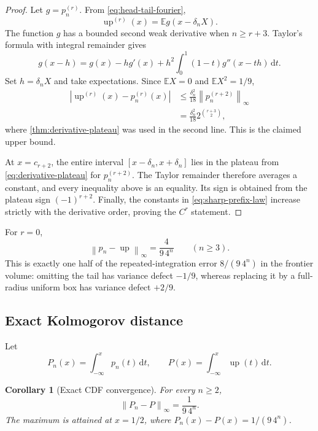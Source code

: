 \documentclass[11pt]{article}
\newtheorem{corollary}[theorem]{Corollary}
\theoremstyle{definition}
\theoremstyle{remark}
\newcommand{\E}{\mathbb E}
\newcommand{\Up}{\operatorname{up}}
\newcommand{\dd}{\,\mathrm d}
\newcommand{\norm}[1]{\left\lVert #1\right\rVert}
\newcommand{\abs}[1]{\left\lvert #1\right\rvert}
\begin{document}
\begin{proof}
Let $g=p_n^{(r)}$.  From \cref{eq:head-tail-fourier},
\[
 \Up^{(r)}(x)=\E g(x-\delta_nX).
\]
The function $g$ has a bounded second weak derivative when $n\ge r+3$.
Taylor's formula with integral remainder gives
\[
 g(x-h)=g(x)-hg'(x)+h^2\int_0^1(1-t)g''(x-th)\dd t.
\]
Set $h=\delta_nX$ and take expectations.  Since $\E X=0$ and $\E X^2=1/9$,
\begin{align*}
 \abs{\Up^{(r)}(x)-p_n^{(r)}(x)}
 &\le\frac{\delta_n^2}{18}\norm{p_n^{(r+2)}}_\infty\\
 &=\frac{\delta_n^2}{18}2^{\binom{r+3}{2}},
\end{align*}
where \cref{thm:derivative-plateau} was used in the second line.  This is the claimed
upper bound.

At $x=c_{r+2}$, the entire interval
$[x-\delta_n,x+\delta_n]$ lies in the plateau from
\cref{eq:derivative-plateau} for $p_n^{(r+2)}$.  The Taylor remainder therefore
averages a constant, and every inequality above is an equality.  Its sign is obtained
from the plateau sign $(-1)^{r+2}$.  Finally, the constants in
\cref{eq:sharp-prefix-law} increase strictly with the derivative order, proving the
$C^r$ statement.
\end{proof}

For $r=0$,
\begin{equation}
 \norm{p_n-\Up}_\infty=\frac{4}{9\,4^n}
 \qquad(n\ge3).
 \label{eq:sharp-uniform-r0}
\end{equation}
This is exactly one half of the repeated-integration error
$8/(9\,4^n)$ in the frontier volume: omitting the tail has variance defect $-1/9$,
whereas replacing it by a full-radius uniform box has variance defect $+2/9$.

\subsection{Exact Kolmogorov distance}

Let
\begin{equation}
 P_n(x)=\int_{-\infty}^x p_n(t)\dd t,
 \qquad
 P(x)=\int_{-\infty}^x\Up(t)\dd t.
 \label{eq:cdfs}
\end{equation}

\begin{corollary}[Exact CDF convergence]
\label{cor:kolmogorov}
For every $n\ge2$,
\begin{equation}
 \boxed{
 \norm{P_n-P}_\infty=\frac{1}{9\,4^n}.}
 \label{eq:kolmogorov}
\end{equation}
The maximum is attained at $x=1/2$, where $P_n(x)-P(x)=1/(9\,4^n)$.
\end{corollary}
\end{document}

